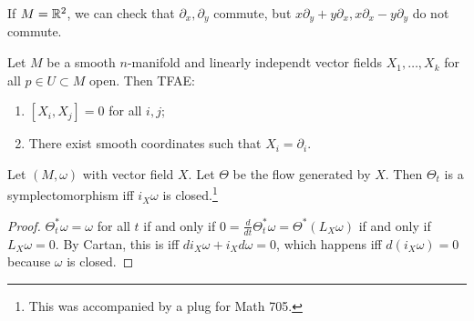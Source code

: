 \documentclass[twoside, 10pt]{article}
\begin{document}
    \begin{exm} If $M = \mathbb{R}^2$, we can check that $\partial_x, \partial_y$
    commute, but $x \partial_y + y \partial_x, x\partial_x - y \partial_y$ do
not commute.  \end{exm}

    \begin{thm} Let $M$ be a smooth $n$-manifold and linearly independt vector
        fields $X_1, \ldots, X_{k}$ for all $p \in U \subset M$ open. Then
        TFAE: \begin{enumerate} \item $[X_i, X_j] = 0$ for all $i,j$; \item
            There exist smooth coordinates such that $X_i = \partial_i$.
    \end{enumerate} \end{thm}

    \begin{exm} Let $(M, \omega)$ with vector field $X$. Let $\Theta$ be the
    flow generated by $X$. Then $\Theta_t$ is a symplectomorphism iff $i_X
\omega$ is closed.\footnote{This was accompanied by a plug for Math 705.}
\end{exm}

    \begin{proof} $\Theta_t^* \omega = \omega$ for all $t$ if and only if $0 =
        \frac{d}{dt} \Theta_t^*\omega = \Theta^*(L_X \omega)$ if and only if
        $L_X \omega = 0$. By Cartan, this is iff $d i_X \omega + i_X d\omega =
        0$, which happens iff $d(i_X \omega) = 0$ because $\omega$ is closed.
    \end{proof}
    
\end{document}
